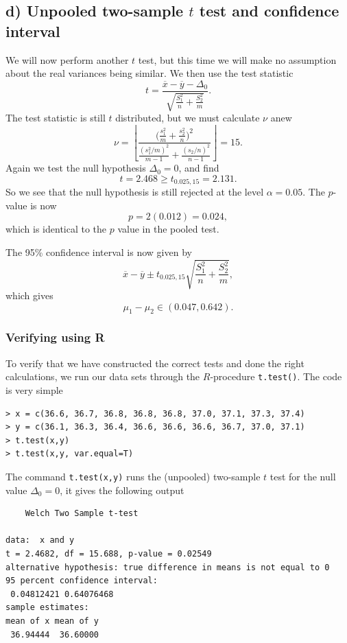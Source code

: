 \documentclass[a4paper, 11pt, titlepage]{article}
\begin{document}
\subsection*{d) Unpooled two-sample $t$ test and confidence interval}

We will now perform another $t$ test, but this time we will make no assumption about the real variances being similar. We then use the test statistic
$$t = \frac{\overline{x} - \overline{y}- \Delta_0}{\sqrt{\frac{S_1^2}{n} + \frac{S_2^2}{m}}}.$$
The test statistic is still $t$ distributed, but we must calculate $\nu$ anew
$$\nu = \left\lfloor\frac{\bigg(\frac{s_1^2}{m} + \frac{s_2^2}{n}\bigg)^2}{\frac{(s_1^2/m)^2}{m-1} + \frac{(s_2/n)^2}{n-1}}\right\rfloor = 15.$$
Again we test the null hypothesis $\Delta_0 = 0$, and find
$$t = 2.468 \geq t_{0.025, 15} = 2.131.$$
So we see that the null hypothesis is still rejected at the level $\alpha = 0.05$. The $p$-value is now
$$p = 2(0.012) = 0.024,$$
which is identical to the $p$ value in the pooled test.

The 95\% confidence interval is now given by
$$\overline{x} - \overline{y} \pm t_{0.025, 15}\sqrt{\frac{S_1^2}{n}+\frac{S_2^2}{m}},$$
which gives
$$\mu_1 - \mu_2 \in (0.047, 0.642).$$

\subsubsection*{Verifying using R}

To verify that we have constructed the correct tests and done the right calculations, we run our data sets through the $R$-procedure \verb+t.test()+. The code is very simple
\begin{lstlisting}
> x = c(36.6, 36.7, 36.8, 36.8, 36.8, 37.0, 37.1, 37.3, 37.4)
> y = c(36.1, 36.3, 36.4, 36.6, 36.6, 36.6, 36.7, 37.0, 37.1)
> t.test(x,y)
> t.test(x,y, var.equal=T)
\end{lstlisting}

The command \verb+t.test(x,y)+ runs the (unpooled) two-sample $t$ test for the null value $\Delta_0 = 0$, it gives the following output

\begin{lstlisting}
	Welch Two Sample t-test

data:  x and y
t = 2.4682, df = 15.688, p-value = 0.02549
alternative hypothesis: true difference in means is not equal to 0
95 percent confidence interval:
 0.04812421 0.64076468
sample estimates:
mean of x mean of y 
 36.94444  36.60000 
\end{lstlisting}
\end{document}

